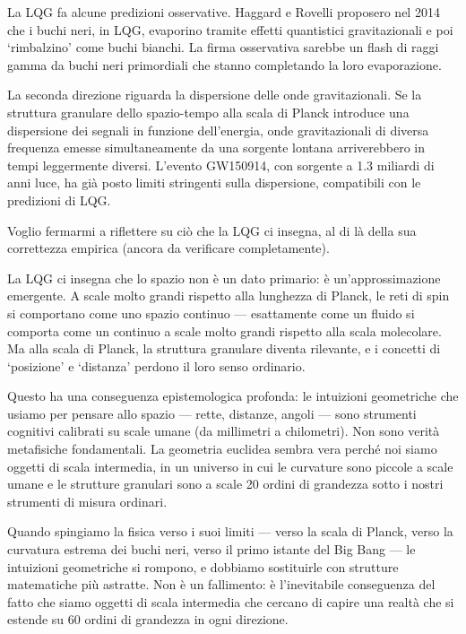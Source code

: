 \documentclass[12pt,a4paper,openany]{book}
\newcommand{\sezione}[1]{\vspace{1.2em}{\large\bfseries #1}\vspace{0.5em}\par}
\begin{document}
\sezione{Predizioni osservative}

La LQG fa alcune predizioni osservative. Haggard e Rovelli proposero nel 2014 che i buchi neri, in LQG, evaporino tramite effetti quantistici gravitazionali e poi `rimbalzino' come buchi bianchi. La firma osservativa sarebbe un flash di raggi gamma da buchi neri primordiali che stanno completando la loro evaporazione.

La seconda direzione riguarda la dispersione delle onde gravitazionali. Se la struttura granulare dello spazio-tempo alla scala di Planck introduce una dispersione dei segnali in funzione dell'energia, onde gravitazionali di diversa frequenza emesse simultaneamente da una sorgente lontana arriverebbero in tempi leggermente diversi. L'evento GW150914, con sorgente a 1.3 miliardi di anni luce, ha già posto limiti stringenti sulla dispersione, compatibili con le predizioni di LQG.

\sezione{Cosa ci insegna la LQG sulla struttura della realtà}

Voglio fermarmi a riflettere su ciò che la LQG ci insegna, al di là della sua correttezza empirica (ancora da verificare completamente).

La LQG ci insegna che lo spazio non è un dato primario: è un'approssimazione emergente. A scale molto grandi rispetto alla lunghezza di Planck, le reti di spin si comportano come uno spazio continuo --- esattamente come un fluido si comporta come un continuo a scale molto grandi rispetto alla scala molecolare. Ma alla scala di Planck, la struttura granulare diventa rilevante, e i concetti di `posizione' e `distanza' perdono il loro senso ordinario.

Questo ha una conseguenza epistemologica profonda: le intuizioni geometriche che usiamo per pensare allo spazio --- rette, distanze, angoli --- sono strumenti cognitivi calibrati su scale umane (da millimetri a chilometri). Non sono verità metafisiche fondamentali. La geometria euclidea sembra vera perché noi siamo oggetti di scala intermedia, in un universo in cui le curvature sono piccole a scale umane e le strutture granulari sono a scale 20 ordini di grandezza sotto i nostri strumenti di misura ordinari.

Quando spingiamo la fisica verso i suoi limiti --- verso la scala di Planck, verso la curvatura estrema dei buchi neri, verso il primo istante del Big Bang --- le intuizioni geometriche si rompono, e dobbiamo sostituirle con strutture matematiche più astratte. Non è un fallimento: è l'inevitabile conseguenza del fatto che siamo oggetti di scala intermedia che cercano di capire una realtà che si estende su 60 ordini di grandezza in ogni direzione.
\end{document}

